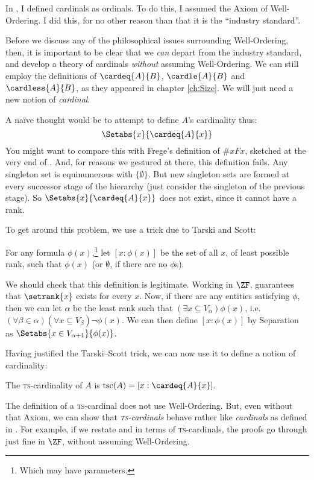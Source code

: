 \documentclass[../../../include/open-logic-section]{subfiles}
\begin{document}
In , I defined cardinals as ordinals. To do this, I assumed the Axiom of Well-Ordering. I did this, for no other reason than that it is the ``industry standard''.

Before we discuss any of the philosophical issues surrounding Well-Ordering, then, it is important to be clear that we \emph{can} depart from the industry standard, and develop a theory of cardinals \emph{without} assuming Well-Ordering. We can still employ the definitions of $\cardeq{A}{B}$, $\cardle{A}{B}$ and $\cardless{A}{B}$, as they appeared in chapter \ref{ch:Size}. We will just need a new notion of \emph{cardinal}.

A na\"ive thought would be to attempt to define $A$'s cardinality thus:
$$\Setabs{x}{\cardeq{A}{x}}$$
You might want to compare this with Frege's definition of $\# x Fx$, sketched at the very end of . And, for reasons we gestured at there, this definition fails. Any singleton set is equinumerous with $\{\emptyset\}$. But new singleton sets are formed at every successor stage of the hierarchy (just consider the singleton of the previous stage). So $\Setabs{x}{\cardeq{A}{x}}$ does not exist, since it cannot have a rank.

To get around this problem, we use a trick due to Tarski and Scott:
\begin{defn}
	For any formula $\phi(x)$,\footnote{Which may have parameters.} let $[ x : \phi(x)] $ be the set of all $x$, of least possible rank, such that $\phi(x)$ (or $\emptyset$, if there are no $\phi$s). 
\end{defn}\noindent
We should check that this definition is legitimate. Working in $\ZF$,  guarantees that $\setrank{x}$ exists for every $x$. Now, if there are any entities satisfying $\phi$, then we can let $\alpha$ be the least rank such that  $(\exists x\subseteq V_\alpha)\phi(x)$, i.e.\ $(\forall \beta \in \alpha)(\forall x \subseteq V_\beta)\lnot \phi(x)$. We can then define $[x : \phi(x)]$ by Separation as $\Setabs{x \in V_{\alpha+1}}{\phi(x)}$. 

Having justified the Tarski--Scott trick, we can now use it to define a notion of cardinality:
\begin{defn}
The \textsc{ts}-cardinality of $A$ is $\text{tsc}(A) = [x : \cardeq{A}{x}]$. 
\end{defn}\noindent
The definition of a \textsc{ts}-cardinal does not use Well-Ordering. But, even without that Axiom, we can show that \emph{\textsc{ts}-cardinals} behave rather like \emph{cardinals} as defined in . For example, if we restate  and  in terms of \textsc{ts}-cardinals, the proofs go through just fine in $\ZF$, without assuming Well-Ordering. 
\end{document}
